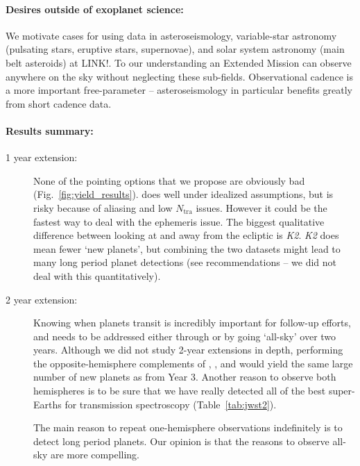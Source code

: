 \paragraph{Desires outside of exoplanet science:}
We motivate cases for using \tess data in asteroseismology, variable-star astronomy (pulsating stars, eruptive stars, supernovae), and solar system astronomy (main belt asteroids) at LINK!.
To our understanding an Extended Mission can observe anywhere on the sky without neglecting these sub-fields.
Observational cadence is a more important free-parameter -- asteroseismology in particular benefits greatly from short cadence data.


\paragraph{Results summary:}
\begin{description}
	\item[1 year extension:]
	None of the pointing options that we propose are obviously bad (Fig.~\ref{fig:yield_results}).
	\hemis\:does well under idealized assumptions, but is risky because of aliasing and low $N_\mathrm{tra}$ issues. 
	However it could be the fastest way to deal with the ephemeris issue.
	The biggest qualitative difference between looking at and away from the ecliptic is \textit{K2}.
	\textit{K2} does mean fewer `new \tess planets', but combining the two datasets might lead to many long period planet detections (see recommendations -- we did not deal with this quantitatively).
	
	\item[2 year extension:]
	Knowing when \tess planets transit is incredibly important for follow-up efforts, and needs to be addressed either through \hemis\:or by going `all-sky' over two years.
	Although we did not study 2-year extensions in depth, performing the opposite-hemisphere complements of \nhemi, \npole, and \shemiAvoid\:would yield the same large number of new planets as from Year 3.
	Another reason to observe both hemispheres is to be sure that we have really detected all of the best super-Earths for transmission spectroscopy (Table~\ref{tab:jwst2}).
	
	The main reason to repeat one-hemisphere observations indefinitely is to detect long period planets.
	Our opinion is that the reasons to observe all-sky are more compelling.
	
\end{description}



